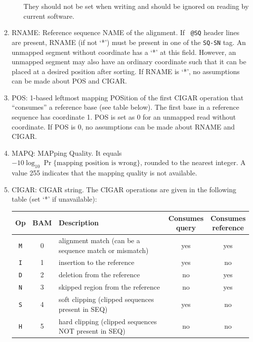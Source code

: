 \documentclass[10pt]{article}
\begin{document}
\begin{enumerate}
\begin{itemize}
    They should not be set when writing and should be ignored on reading
    by current software.
  \end{itemize}
\item {\sf RNAME}: Reference sequence NAME of the alignment. If {\tt
    @SQ} header lines are present, {\sf RNAME} (if not `*') must be
  present in one of the {\tt SQ-SN} tag. An unmapped segment without
  coordinate has a `*' at this field. However, an unmapped segment may
  also have an ordinary coordinate such that it can be placed at a
  desired position after sorting. If {\sf RNAME} is `*', no assumptions
  can be made about {\sf POS} and {\sf CIGAR}.
\item {\sf POS}: 1-based leftmost mapping POSition of the first {\sf
    CIGAR} operation that ``consumes'' a reference base (see table below).
    The first base in a reference sequence has coordinate 1. {\sf
    POS} is set as 0 for an unmapped read without coordinate. If {\sf
    POS} is 0, no assumptions can be made about {\sf RNAME} and {\sf
    CIGAR}.
\item {\sf MAPQ}: MAPping Quality. It equals
  $-10\log_{10}\Pr\{\mbox{mapping position is wrong}\}$, rounded to the
  nearest integer. A value 255 indicates that the mapping quality is not
  available.
\item {\sf CIGAR}: CIGAR string. The CIGAR operations are given in the
  following table (set `*' if unavailable):
  \begin{center}\small
  \begin{tabular}{cclcc}
  \hline
  Op & BAM & Description & \makecell{Consumes \\ query} & \makecell{Consumes \\ reference}\\
  \hline
  {\tt M} & 0 & alignment match (can be a sequence match or mismatch)       & yes & yes \\
  {\tt I} & 1 & insertion to the reference                                  & yes & no  \\
  {\tt D} & 2 & deletion from the reference                                 & no  & yes \\
  {\tt N} & 3 & skipped region from the reference                           & no  & yes \\
  {\tt S} & 4 & soft clipping (clipped sequences present in {\sf SEQ})      & yes & no  \\
  {\tt H} & 5 & hard clipping (clipped sequences NOT present in {\sf SEQ})  & no  & no  \\

\end{tabular}
\end{center}
\end{enumerate}
\end{document}
